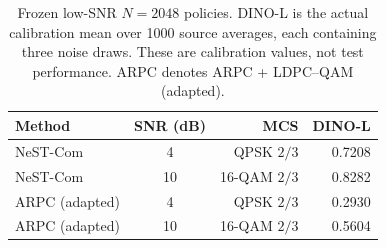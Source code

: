 \begin{table}[t]
\centering
\caption{Frozen low-SNR $N=2048$ policies. DINO-L is the actual calibration mean over 1000 source averages, each containing three noise draws. These are calibration values, not test performance. ARPC denotes ARPC + LDPC--QAM (adapted).}
\label{tab:adaptivepolicies}
\footnotesize\setlength{\tabcolsep}{3.5pt}
\begin{tabular}{lcrr}
\toprule
Method & SNR (dB) & MCS & DINO-L \\
\midrule
NeST-Com & 4 & QPSK $2/3$ & 0.7208 \\
NeST-Com & 10 & 16-QAM $2/3$ & 0.8282 \\
ARPC (adapted) & 4 & QPSK $2/3$ & 0.2930 \\
ARPC (adapted) & 10 & 16-QAM $2/3$ & 0.5604 \\
\bottomrule
\end{tabular}
\end{table}
